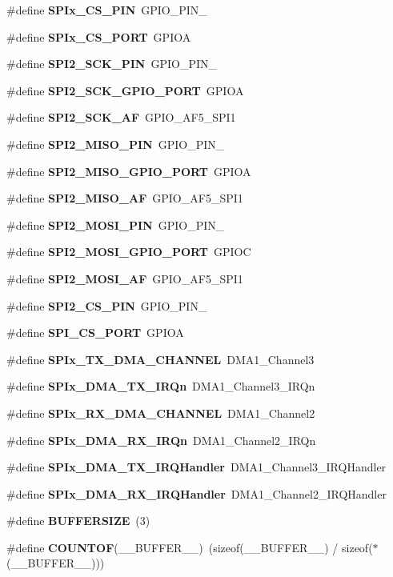 \begin{DoxyCompactItemize}
\#define \textbf{ S\+P\+Ix\+\_\+\+C\+S\+\_\+\+P\+IN}~G\+P\+I\+O\+\_\+\+P\+I\+N\+\_
\item 
\#define \textbf{ S\+P\+Ix\+\_\+\+C\+S\+\_\+\+P\+O\+RT}~G\+P\+I\+OA
\item 
\#define \textbf{ S\+P\+I2\+\_\+\+S\+C\+K\+\_\+\+P\+IN}~G\+P\+I\+O\+\_\+\+P\+I\+N\+\_
\item 
\#define \textbf{ S\+P\+I2\+\_\+\+S\+C\+K\+\_\+\+G\+P\+I\+O\+\_\+\+P\+O\+RT}~G\+P\+I\+OA
\item 
\#define \textbf{ S\+P\+I2\+\_\+\+S\+C\+K\+\_\+\+AF}~G\+P\+I\+O\+\_\+\+A\+F5\+\_\+\+S\+P\+I1
\item 
\#define \textbf{ S\+P\+I2\+\_\+\+M\+I\+S\+O\+\_\+\+P\+IN}~G\+P\+I\+O\+\_\+\+P\+I\+N\+\_
\item 
\#define \textbf{ S\+P\+I2\+\_\+\+M\+I\+S\+O\+\_\+\+G\+P\+I\+O\+\_\+\+P\+O\+RT}~G\+P\+I\+OA
\item 
\#define \textbf{ S\+P\+I2\+\_\+\+M\+I\+S\+O\+\_\+\+AF}~G\+P\+I\+O\+\_\+\+A\+F5\+\_\+\+S\+P\+I1
\item 
\#define \textbf{ S\+P\+I2\+\_\+\+M\+O\+S\+I\+\_\+\+P\+IN}~G\+P\+I\+O\+\_\+\+P\+I\+N\+\_
\item 
\#define \textbf{ S\+P\+I2\+\_\+\+M\+O\+S\+I\+\_\+\+G\+P\+I\+O\+\_\+\+P\+O\+RT}~G\+P\+I\+OC
\item 
\#define \textbf{ S\+P\+I2\+\_\+\+M\+O\+S\+I\+\_\+\+AF}~G\+P\+I\+O\+\_\+\+A\+F5\+\_\+\+S\+P\+I1
\item 
\#define \textbf{ S\+P\+I2\+\_\+\+C\+S\+\_\+\+P\+IN}~G\+P\+I\+O\+\_\+\+P\+I\+N\+\_
\item 
\#define \textbf{ S\+P\+I\+\_\+\+C\+S\+\_\+\+P\+O\+RT}~G\+P\+I\+OA
\item 
\#define \textbf{ S\+P\+Ix\+\_\+\+T\+X\+\_\+\+D\+M\+A\+\_\+\+C\+H\+A\+N\+N\+EL}~D\+M\+A1\+\_\+\+Channel3
\item 
\#define \textbf{ S\+P\+Ix\+\_\+\+D\+M\+A\+\_\+\+T\+X\+\_\+\+I\+R\+Qn}~D\+M\+A1\+\_\+\+Channel3\+\_\+\+I\+R\+Qn
\item 
\#define \textbf{ S\+P\+Ix\+\_\+\+R\+X\+\_\+\+D\+M\+A\+\_\+\+C\+H\+A\+N\+N\+EL}~D\+M\+A1\+\_\+\+Channel2
\item 
\#define \textbf{ S\+P\+Ix\+\_\+\+D\+M\+A\+\_\+\+R\+X\+\_\+\+I\+R\+Qn}~D\+M\+A1\+\_\+\+Channel2\+\_\+\+I\+R\+Qn
\item 
\#define \textbf{ S\+P\+Ix\+\_\+\+D\+M\+A\+\_\+\+T\+X\+\_\+\+I\+R\+Q\+Handler}~D\+M\+A1\+\_\+\+Channel3\+\_\+\+I\+R\+Q\+Handler
\item 
\#define \textbf{ S\+P\+Ix\+\_\+\+D\+M\+A\+\_\+\+R\+X\+\_\+\+I\+R\+Q\+Handler}~D\+M\+A1\+\_\+\+Channel2\+\_\+\+I\+R\+Q\+Handler
\item 
\#define \textbf{ B\+U\+F\+F\+E\+R\+S\+I\+ZE}~(3)
\item 
\#define \textbf{ C\+O\+U\+N\+T\+OF}(\+\_\+\+\_\+\+B\+U\+F\+F\+E\+R\+\_\+\+\_\+)~(sizeof(\+\_\+\+\_\+\+B\+U\+F\+F\+E\+R\+\_\+\+\_\+) / sizeof($\ast$(\+\_\+\+\_\+\+B\+U\+F\+F\+E\+R\+\_\+\+\_\+)))
\end{DoxyCompactItemize}


